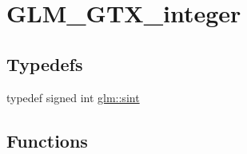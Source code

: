 \hypertarget{group__gtx__integer}{}\section{G\+L\+M\+\_\+\+G\+T\+X\+\_\+integer}
\label{group__gtx__integer}
\subsection*{Typedefs}
\begin{DoxyCompactItemize}
\item 
typedef signed int \mbox{\hyperlink{group__gtx__integer_ga73643e09d8c6d362418aec541fdb987d}{glm\+::sint}}
\end{DoxyCompactItemize}
\subsection*{Functions}

